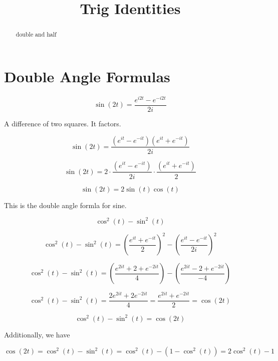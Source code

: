 \documentclass{ximera}
\title{Trig Identities}
\begin{document}
\begin{abstract}
double and half
\end{abstract}
\maketitle






\section{Double Angle Formulas}


\[   \sin(2t) = \frac{e^{i 2t} - e^{-i 2t}}{2 i}      \]


A difference of two squares.  It factors.



\[   \sin(2t) = \frac{(e^{i t} - e^{-i t})(e^{i t} + e^{-i t})}{2 i}      \]




\[   \sin(2t) = 2 \cdot \frac{(e^{i t} - e^{-i t})}{2i}    \cdot    \frac{(e^{i t} + e^{-i t})}{2}      \]



\[   \sin(2t) = 2 \sin(t)   \cos(t)      \]

This is the double angle formla for sine.











\[      \cos^2(t) - \sin^2(t)      \]



\[      \cos^2(t) - \sin^2(t)   = \left( \frac{e^{i t} + e^{-i t}}{2} \right)^2 - \left( \frac{e^{i t} - e^{-i t}}{2i} \right)^2  \]


\[      \cos^2(t) - \sin^2(t)   = \left( \frac{e^{2i t} + 2 + e^{-2i t}}{4} \right) - \left( \frac{e^{2 i t} - 2 + e^{-2i t}}{-4} \right)  \]



\[      \cos^2(t) - \sin^2(t)   = \frac{2 e^{2i t}  + 2 e^{-2i t}}{4}   = \frac{e^{2i t}  + e^{-2i t}}{2} = \cos(2t)   \]




\[      \cos^2(t) - \sin^2(t)  = \cos(2t)    \]



Additionally, we have 




\[   \cos(2t) =    \cos^2(t) - \sin^2(t)  =    \cos^2(t) - (1 - \cos^2(t)) =  2 \cos^2(t) - 1 \]
\end{document}
